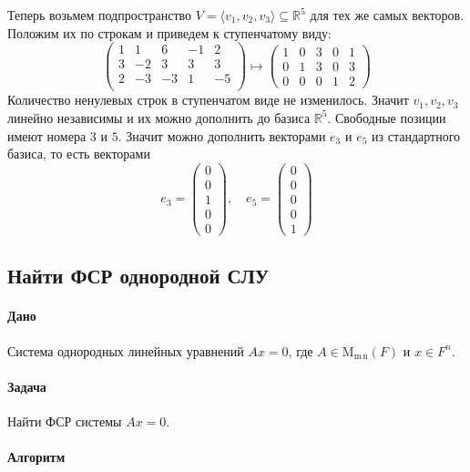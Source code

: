 \documentclass{article}
\newcommand{\MatrixDim}[3]{\operatorname{\mathrm{M}_{#2\,#3}}(#1)}
\begin{document}
Теперь возьмем подпространство $V = \langle v_1, v_2, v_3\rangle\subseteq \mathbb R^5$ для тех же самых векторов.
Положим их по строкам и приведем к ступенчатому виду:
\[
\begin{pmatrix}
1&1&6&-1&2\\
3&-2&3&3&3\\
2&-3&-3&1&-5\\
\end{pmatrix}
\mapsto
\begin{pmatrix}
1&0&3&0&1\\
0&1&3&0&3\\
0&0&0&1&2
\end{pmatrix}
\]
Количество ненулевых строк в ступенчатом виде не изменилось.
Значит $v_1, v_2, v_3$ линейно независимы и их можно дополнить до базиса $\mathbb R^5$.
Свободные позиции имеют номера $3$ и $5$.
Значит можно дополнить векторами $e_3$ и $e_5$ из стандартного базиса, то есть векторами
\[
e_3 =
\begin{pmatrix}
0\\0\\1\\0\\0
\end{pmatrix}
,\quad
e_5 =
\begin{pmatrix}
0\\0\\0\\0\\1
\end{pmatrix}
\]

\subsection{Найти ФСР однородной СЛУ}

\paragraph{Дано}

Система однородных линейных уравнений $Ax = 0$, где $A\in \MatrixDim{F}{m}{n}$ и $x\in F^{n}$.

\paragraph{Задача}

Найти ФСР системы $Ax = 0$.

\paragraph{Алгоритм}
\end{document}
